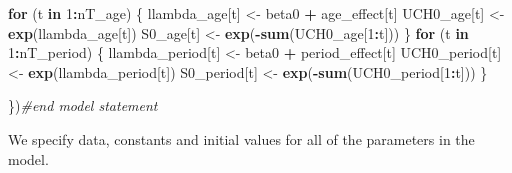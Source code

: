 \documentclass[11pt,]{article}
\newenvironment{Shaded}{\begin{snugshade}}{\end{snugshade}}
\newcommand{\KeywordTok}[1]{\textcolor[rgb]{0.13,0.29,0.53}{\textbf{#1}}}
\newcommand{\DecValTok}[1]{\textcolor[rgb]{0.00,0.00,0.81}{#1}}
\newcommand{\StringTok}[1]{\textcolor[rgb]{0.31,0.60,0.02}{#1}}
\newcommand{\CommentTok}[1]{\textcolor[rgb]{0.56,0.35,0.01}{\textit{#1}}}
\newcommand{\ControlFlowTok}[1]{\textcolor[rgb]{0.13,0.29,0.53}{\textbf{#1}}}
\newcommand{\OperatorTok}[1]{\textcolor[rgb]{0.81,0.36,0.00}{\textbf{#1}}}
\newcommand{\NormalTok}[1]{#1}
\begin{document}
\begin{Shaded}
\begin{Highlighting}[]
  \ControlFlowTok{for}\NormalTok{ (t }\ControlFlowTok{in} \DecValTok{1}\OperatorTok{:}\NormalTok{nT_age) \{}
\NormalTok{    llambda_age[t] <-}\StringTok{ }\NormalTok{beta0 }\OperatorTok{+}\StringTok{ }\NormalTok{age_effect[t]}
\NormalTok{    UCH0_age[t] <-}\StringTok{ }\KeywordTok{exp}\NormalTok{(llambda_age[t])}
\NormalTok{    S0_age[t] <-}\StringTok{ }\KeywordTok{exp}\NormalTok{(}\OperatorTok{-}\KeywordTok{sum}\NormalTok{(UCH0_age[}\DecValTok{1}\OperatorTok{:}\NormalTok{t]))}
\NormalTok{  \}}
  \ControlFlowTok{for}\NormalTok{ (t }\ControlFlowTok{in} \DecValTok{1}\OperatorTok{:}\NormalTok{nT_period) \{}
\NormalTok{    llambda_period[t] <-}\StringTok{ }\NormalTok{beta0 }\OperatorTok{+}\StringTok{ }\NormalTok{period_effect[t]}
\NormalTok{    UCH0_period[t] <-}\StringTok{ }\KeywordTok{exp}\NormalTok{(llambda_period[t])}
\NormalTok{    S0_period[t] <-}\StringTok{ }\KeywordTok{exp}\NormalTok{(}\OperatorTok{-}\KeywordTok{sum}\NormalTok{(UCH0_period[}\DecValTok{1}\OperatorTok{:}\NormalTok{t]))}
\NormalTok{  \}}

\NormalTok{\})}\CommentTok{#end model statement}
\end{Highlighting}
\end{Shaded}

We specify data, constants and initial values for all of the parameters
in the model.
\end{document}
